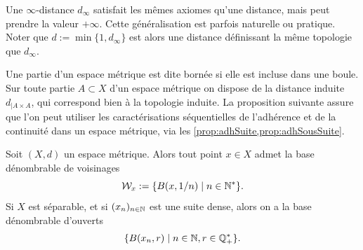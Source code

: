 
\begin{remark}
\label{rem:distInfinie}
%
Une $\infty$-distance $d_\infty$ satisfait les mêmes axiomes qu'une distance, mais peut prendre la valeur $+\infty$. Cette généralisation est parfois naturelle ou pratique. Noter que $d := \min\{1,d_\infty\}$ est alors une distance définissant la même topologie que $d_\infty$. 
\end{remark}


Une partie d'un espace métrique est dite bornée si elle est incluse dans une boule. 
Sur toute partie $A \subset X$ d'un espace métrique on dispose de la distance induite $d_{|A \times A}$, qui correspond bien à la topologie induite. 
La proposition suivante assure que l'on peut utiliser les caractérisations séquentielles de l'adhérence et de la continuité dans un espace métrique, via les \cref{prop:adhSuite,prop:adhSousSuite}.

\begin{proposition}
\label{prop:baseVoisMetric}
%
	Soit $(X,d)$ un espace métrique. 
	Alors tout point $x \in X$ admet la base dénombrable de voisinages 
	\begin{equation}
	\label{eqdef:base_vois_metric}
		\mathcal{W}_x := \{B(x,1/n) \mid n \in \mathbb{N}^*\}.		
	\end{equation}
	Si $X$ est séparable, et si $(x_n)_{n \in \mathbb{N}}$ est une suite dense, alors on a la base dénombrable d'ouverts 
	$$
		\{B(x_n,r) \mid n\in \mathbb{N}, r \in \mathbb{Q}_+^*\}.
	$$
\end{proposition}

